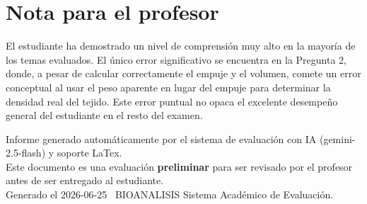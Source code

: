 \documentclass[11pt,a4paper]{article}
\begin{document}
\section*{Nota para el profesor}
\begin{tcolorbox}[
  enhanced, breakable,
  colback=yellow!8, colframe=yellow!60!black,
  fonttitle=\bfseries, coltitle=black,
  title={Observaciones para revisión manual},
  top=4pt, bottom=4pt, left=8pt, right=8pt,
]
El estudiante ha demostrado un nivel de comprensión muy alto en la mayoría de los temas evaluados. El único error significativo se encuentra en la Pregunta 2, donde, a pesar de calcular correctamente el empuje y el volumen, comete un error conceptual al usar el peso aparente en lugar del empuje para determinar la densidad real del tejido. Este error puntual no opaca el excelente desempeño general del estudiante en el resto del examen.
\end{tcolorbox}

\vspace{12pt}
\begin{center}
  \footnotesize\color{gray}
  Informe generado automáticamente por el sistema de evaluación con IA (gemini-2.5-flash) y soporte LaTex. \\
  Este documento es una evaluación \textbf{preliminar} para ser revisado por el profesor antes de ser entregado al 
  estudiante. \\
  Generado el 2026-06-25 \textbullet\ BIOANALISIS Sistema Académico de Evaluación.
  \end{center}
\end{document}
